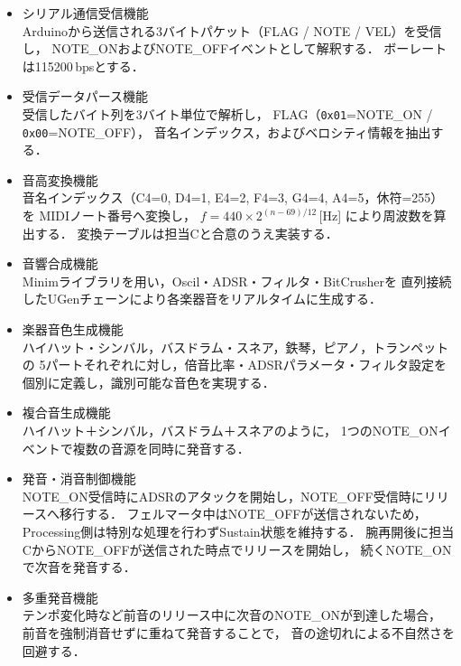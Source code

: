 \documentclass[lualatex,book,paper=a4paper,jafontsize=11.5pt,jafontscale=1.05,oneside]{jlreq}
\begin{document}
\begin{itemize}

  \item シリアル通信受信機能 \\
  Arduinoから送信される3バイトパケット（FLAG / NOTE / VEL）を受信し，
  NOTE\_ONおよびNOTE\_OFFイベントとして解釈する．
  ボーレートは115200\,bpsとする．

  \item 受信データパース機能 \\
  受信したバイト列を3バイト単位で解析し，
  FLAG（\texttt{0x01}=NOTE\_ON / \texttt{0x00}=NOTE\_OFF），
  音名インデックス，およびベロシティ情報を抽出する．

  \item 音高変換機能 \\
  音名インデックス（C4=0, D4=1, E4=2, F4=3, G4=4, A4=5，休符=255）を
  MIDIノート番号へ変換し，
  $f = 440 \times 2^{(n-69)/12}$\,[Hz] により周波数を算出する．
  変換テーブルは担当Cと合意のうえ実装する．

  \item 音響合成機能 \\
  Minimライブラリを用い，Oscil・ADSR・フィルタ・BitCrusherを
  直列接続したUGenチェーンにより各楽器音をリアルタイムに生成する．

  \item 楽器音色生成機能 \\
  ハイハット・シンバル，バスドラム・スネア，鉄琴，ピアノ，トランペットの
  5パートそれぞれに対し，倍音比率・ADSRパラメータ・フィルタ設定を
  個別に定義し，識別可能な音色を実現する．

  \item 複合音生成機能 \\
  ハイハット＋シンバル，バスドラム＋スネアのように，
  1つのNOTE\_ONイベントで複数の音源を同時に発音する．

  \item 発音・消音制御機能 \\
  NOTE\_ON受信時にADSRのアタックを開始し，NOTE\_OFF受信時にリリースへ移行する．
  フェルマータ中はNOTE\_OFFが送信されないため，
  Processing側は特別な処理を行わずSustain状態を維持する．
  腕再開後に担当CからNOTE\_OFFが送信された時点でリリースを開始し，
  続くNOTE\_ONで次音を発音する．

  \item 多重発音機能 \\
  テンポ変化時など前音のリリース中に次音のNOTE\_ONが到達した場合，
  前音を強制消音せずに重ねて発音することで，
  音の途切れによる不自然さを回避する．


\end{itemize}
\end{document}
